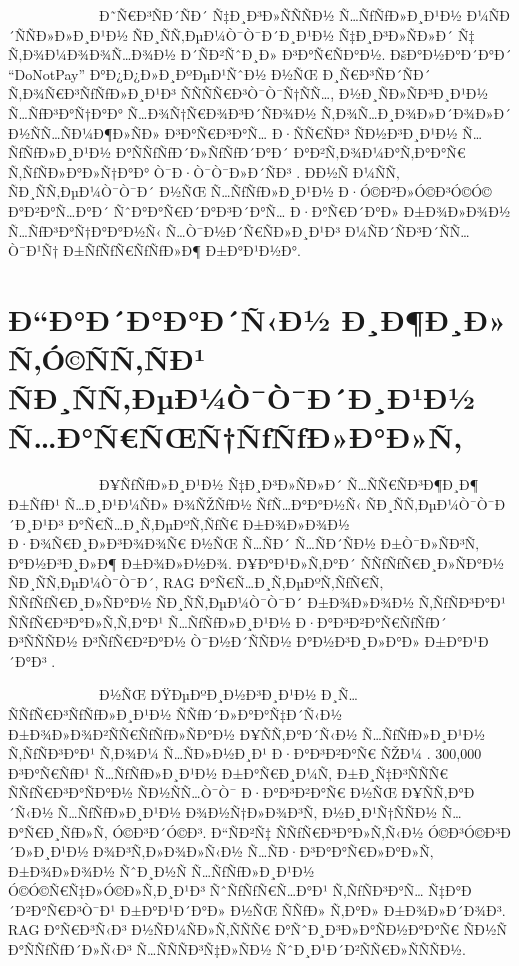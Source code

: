 \documentclass[12pt,A4]{report}
\begin{document}
\ \ \ \ \ \ \ \ \  \ \ \ \ Ð˜Ñ€Ð³ÑÐ´ÑÐ´ Ñ‡Ð¸Ð³Ð»ÑÑÑÐ½ Ñ…ÑƒÑƒÐ»Ð¸Ð¹Ð½ Ð¼ÑÐ´ÑÑÐ»Ð»Ð¸Ð¹Ð½ ÑÐ¸ÑÑ‚ÐµÐ¼Ò¯Ò¯Ð´Ð¸Ð¹Ð½
Ñ‡Ð¸Ð³Ð»ÑÐ»Ð´ Ñ‡ Ñ‚Ð¾Ð¼Ð¾Ð¾Ñ…Ð¾Ð½ Ð´ÑÐ²ÑˆÐ¸Ð» Ð³Ð°Ñ€ÑÐ°Ð½. ÐšÐ°Ð½Ð°Ð´Ð°Ð´ ``DoNotPay'' Ð°Ð¿Ð¿Ð»Ð¸ÐºÐµÐ¹ÑˆÐ½ Ð½ÑŒ
Ð¸Ñ€Ð³ÑÐ´ÑÐ´ Ñ‚Ð¾Ñ€Ð³ÑƒÑƒÐ»Ð¸Ð¹Ð³ ÑÑÑÑ€Ð³Ò¯Ò¯Ñ†ÑÑ…, Ð½Ð¸ÑÐ»ÑÐ³Ð¸Ð¹Ð½ Ñ…ÑƒÐ³Ð°Ñ†Ð°Ð° Ñ…Ð¾Ñ†Ñ€Ð¾Ð³Ð´ÑÐ¾Ð½ Ñ‚Ð¾Ñ…Ð¸Ð¾Ð»Ð´Ð¾Ð»Ð´
Ð½ÑÑ…ÑÐ¼Ð¶Ð»ÑÐ» Ð³Ð°Ñ€Ð³Ð°Ñ… Ð·ÑÑ€ÑÐ³ ÑÐ½Ð³Ð¸Ð¹Ð½ Ñ…ÑƒÑƒÐ»Ð¸Ð¹Ð½ Ð°ÑÑƒÑƒÐ´Ð»ÑƒÑƒÐ´Ð°Ð´ Ð°Ð²Ñ‚Ð¾Ð¼Ð°Ñ‚Ð°Ð°Ñ€ Ñ‚ÑƒÑÐ»Ð°Ð»Ñ†Ð°Ð°
Ò¯Ð·Ò¯Ò¯Ð»Ð´ÑÐ³ \cite{donotpay2023}. Ð­Ð½Ñ Ð¼ÑÑ‚ ÑÐ¸ÑÑ‚ÐµÐ¼Ò¯Ò¯Ð´ Ð½ÑŒ Ñ…ÑƒÑƒÐ»Ð¸Ð¹Ð½ Ð·Ó©Ð²Ð»Ó©Ð³Ó©Ó©
Ð°Ð²Ð°Ñ…Ð°Ð´ ÑˆÐ°Ð°Ñ€Ð´Ð°Ð³Ð´Ð°Ñ… Ð·Ð°Ñ€Ð´Ð°Ð» Ð±Ð¾Ð»Ð¾Ð½ Ñ…ÑƒÐ³Ð°Ñ†Ð°Ð°Ð½Ñ‹ Ñ…Ò¯Ð½Ð´Ñ€ÑÐ»Ð¸Ð¹Ð³ Ð¼ÑÐ´ÑÐ³Ð´ÑÑ…Ò¯Ð¹Ñ†
Ð±ÑƒÑƒÑ€ÑƒÑƒÐ»Ð¶ Ð±Ð°Ð¹Ð½Ð°.

\section{Ð“Ð°Ð´Ð°Ð°Ð´Ñ‹Ð½ Ð¸Ð¶Ð¸Ð» Ñ‚Ó©ÑÑ‚ÑÐ¹ ÑÐ¸ÑÑ‚ÐµÐ¼Ò¯Ò¯Ð´Ð¸Ð¹Ð½ Ñ…Ð°Ñ€ÑŒÑ†ÑƒÑƒÐ»Ð°Ð»Ñ‚}

\ \ \ \ \ \ \ \ \  \ \ \ \ Ð¥ÑƒÑƒÐ»Ð¸Ð¹Ð½ Ñ‡Ð¸Ð³Ð»ÑÐ»Ð´ Ñ…ÑÑ€ÑÐ³Ð¶Ð¸Ð¶ Ð±ÑƒÐ¹ Ñ…Ð¸Ð¹Ð¼ÑÐ» Ð¾ÑŽÑƒÐ½
ÑƒÑ…Ð°Ð°Ð½Ñ‹ ÑÐ¸ÑÑ‚ÐµÐ¼Ò¯Ò¯Ð´Ð¸Ð¹Ð³ Ð°Ñ€Ñ…Ð¸Ñ‚ÐµÐºÑ‚ÑƒÑ€ Ð±Ð¾Ð»Ð¾Ð½ Ð·Ð¾Ñ€Ð¸Ð»Ð³Ð¾Ð¾Ñ€ Ð½ÑŒ Ñ…ÑÐ´ Ñ…ÑÐ´ÑÐ½ Ð±Ò¯Ð»ÑÐ³Ñ‚
Ð°Ð½Ð³Ð¸Ð»Ð¶ Ð±Ð¾Ð»Ð½Ð¾. Ð¥Ð°Ð¹Ð»Ñ‚Ð°Ð´ ÑÑƒÑƒÑ€Ð¸Ð»ÑÐ°Ð½ ÑÐ¸ÑÑ‚ÐµÐ¼Ò¯Ò¯Ð´, RAG Ð°Ñ€Ñ…Ð¸Ñ‚ÐµÐºÑ‚ÑƒÑ€Ñ‚ ÑÑƒÑƒÑ€Ð¸Ð»ÑÐ°Ð½
ÑÐ¸ÑÑ‚ÐµÐ¼Ò¯Ò¯Ð´ Ð±Ð¾Ð»Ð¾Ð½ Ñ‚ÑƒÑÐ³Ð°Ð¹ ÑÑƒÑ€Ð³Ð°Ð»Ñ‚Ñ‚Ð°Ð¹ Ñ…ÑƒÑƒÐ»Ð¸Ð¹Ð½ Ð·Ð°Ð³Ð²Ð°Ñ€ÑƒÑƒÐ´ Ð³ÑÑÑÐ½ Ð³ÑƒÑ€Ð²Ð°Ð½ Ò¯Ð½Ð´ÑÑÐ½
Ð°Ð½Ð³Ð¸Ð»Ð°Ð» Ð±Ð°Ð¹Ð´Ð°Ð³ \cite{cui2023chatlaw}.

\ \ \ \ \ \ \ \ \  \ \ \ \ \ChatLaw Ð½ÑŒ ÐŸÐµÐºÐ¸Ð½Ð³Ð¸Ð¹Ð½ Ð¸Ñ… ÑÑƒÑ€Ð³ÑƒÑƒÐ»Ð¸Ð¹Ð½
ÑÑƒÐ´Ð»Ð°Ð°Ñ‡Ð´Ñ‹Ð½ Ð±Ð¾Ð»Ð¾Ð²ÑÑ€ÑƒÑƒÐ»ÑÐ°Ð½ Ð¥ÑÑ‚Ð°Ð´Ñ‹Ð½ Ñ…ÑƒÑƒÐ»Ð¸Ð¹Ð½ Ñ‚ÑƒÑÐ³Ð°Ð¹ Ñ‚Ð¾Ð¼ Ñ…ÑÐ»Ð½Ð¸Ð¹ Ð·Ð°Ð³Ð²Ð°Ñ€ ÑŽÐ¼
\cite{cui2023chatlaw}. 300,000 Ð³Ð°Ñ€ÑƒÐ¹ Ñ…ÑƒÑƒÐ»Ð¸Ð¹Ð½ Ð±Ð°Ñ€Ð¸Ð¼Ñ‚ Ð±Ð¸Ñ‡Ð³ÑÑÑ€ ÑÑƒÑ€Ð³Ð°ÑÐ°Ð½
ÑÐ½ÑÑ…Ò¯Ò¯ Ð·Ð°Ð³Ð²Ð°Ñ€ Ð½ÑŒ Ð¥ÑÑ‚Ð°Ð´Ñ‹Ð½ Ñ…ÑƒÑƒÐ»Ð¸Ð¹Ð½ Ð¾Ð½Ñ†Ð»Ð¾Ð³Ñ‚ Ð½Ð¸Ð¹Ñ†ÑÑÐ½ Ñ…Ð°Ñ€Ð¸ÑƒÐ»Ñ‚ Ó©Ð³Ð´Ó©Ð³.
Ð“ÑÐ²Ñ‡ ÑÑƒÑ€Ð³Ð°Ð»Ñ‚Ñ‹Ð½ Ó©Ð³Ó©Ð³Ð´Ð»Ð¸Ð¹Ð½ Ð¾Ð³Ñ‚Ð»Ð¾Ð»Ñ‹Ð½ Ñ…ÑÐ·Ð³Ð°Ð°Ñ€Ð»Ð°Ð»Ñ‚ Ð±Ð¾Ð»Ð¾Ð½ ÑˆÐ¸Ð½Ñ Ñ…ÑƒÑƒÐ»Ð¸Ð¹Ð½
Ó©Ó©Ñ€Ñ‡Ð»Ó©Ð»Ñ‚Ð¸Ð¹Ð³ ÑˆÑƒÑƒÑ€Ñ…Ð°Ð¹ Ñ‚ÑƒÑÐ³Ð°Ñ… Ñ‡Ð°Ð´Ð²Ð°Ñ€Ð³Ò¯Ð¹ Ð±Ð°Ð¹Ð´Ð°Ð» Ð½ÑŒ ÑÑƒÐ» Ñ‚Ð°Ð» Ð±Ð¾Ð»Ð´Ð¾Ð³.
RAG Ð°Ñ€Ð³Ñ‹Ð³ Ð½ÑÐ¼ÑÐ»Ñ‚ÑÑÑ€ Ð°ÑˆÐ¸Ð³Ð»Ð°ÑÐ½Ð°Ð°Ñ€ ÑÐ½Ñ Ð°ÑÑƒÑƒÐ´Ð»Ñ‹Ð³ Ñ…ÑÑÑÐ³Ñ‡Ð»ÑÐ½ ÑˆÐ¸Ð¹Ð´Ð²ÑÑ€Ð»ÑÑÑÐ½.
\end{document}
